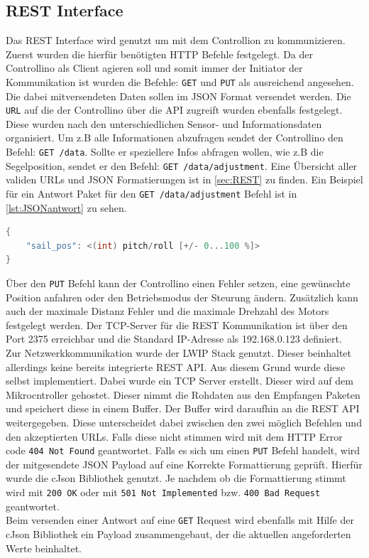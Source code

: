 \subsection{\ac{REST} Interface}
Das \ac{REST} Interface wird genutzt um mit dem Controllion zu kommunizieren. Zuerst wurden die hierfür benötigten \ac{HTTP} Befehle festgelegt. Da der Controllino als Client agieren soll und somit immer der Initiator der Kommunikation ist wurden die Befehle: \verb|GET| und \verb|PUT| als ausreichend angesehen. Die dabei mitversendeten Daten sollen im \ac{JSON} Format versendet werden. Die \verb|URL| auf die der Controllino über die \ac{API} zugreift wurden ebenfalls festgelegt. Diese wurden nach den unterschiedlichen Sensor- und Informationsdaten organisiert. Um z.B alle Informationen abzufragen sendet der Controllino den Befehl: \verb|GET /data|. Sollte er speziellere Infos abfragen wollen, wie z.B die Segelposition, sendet er den Befehl: \verb|GET /data/adjustment|. Eine Übersicht aller validen \ac{URL}s und JSON Formatierungen ist in \autoref{sec:REST} zu finden. Ein Beispiel für ein Antwort Paket für den \verb|GET /data/adjustment| Befehl ist in \autoref{lst:JSONantwort} zu sehen.
\begin{lstlisting}[language=C, caption={GET /data/adjustment Antwort Paket}, label={lst:JSONantwort}]
{
	"sail_pos": <(int) pitch/roll [+/- 0...100 %]>
}

\end{lstlisting}
Über den \verb|PUT| Befehl kann der Controllino einen Fehler setzen, eine gewünschte Position anfahren oder den Betriebsmodus der Steurung ändern. Zusätzlich kann auch der maximale Distanz Fehler und die maximale Drehzahl des Motors festgelegt werden. Der TCP-Server für die REST Kommunikation ist über den Port 2375 erreichbar und die Standard IP-Adresse als 192.168.0.123 definiert.\\

\noindent Zur Netzwerkkommunikation wurde der \ac{LWIP} Stack genutzt. Dieser beinhaltet allerdings keine bereits integrierte \ac{REST} \ac{API}. Aus diesem Grund wurde diese selbst implementiert. Dabei wurde ein \ac{TCP} Server erstellt. Dieser wird auf dem Mikrocntroller gehostet. Dieser nimmt die Rohdaten aus den Empfangen Paketen und speichert diese in einem Buffer. Der Buffer wird daraufhin an die \ac{REST} \ac{API} weitergegeben. Diese unterscheidet dabei zwischen den zwei möglich Befehlen und den akzeptierten \ac{URL}s. Falls diese nicht stimmen wird mit dem \ac{HTTP} Error code \verb|404 Not Found| geantwortet. Falls es sich um einen \verb|PUT| Befehl handelt, wird der mitgesendete JSON Payload auf eine Korrekte Formattierung geprüft. Hierfür wurde die cJson Bibliothek genutzt. Je nachdem ob die Formattierung stimmt wird mit \verb|200 OK| oder mit \verb|501 Not Implemented| bzw. \verb|400 Bad Request| geantwortet.\\
\noindent Beim versenden einer Antwort auf eine \verb|GET| Request wird ebenfalls mit Hilfe der cJson Bibliothek ein Payload zusammengebaut, der die aktuellen angeforderten Werte beinhaltet.
